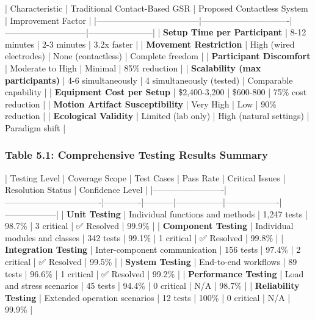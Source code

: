 \documentclass[12pt,a4paper]{report}
\begin{document}
| Characteristic                     | Traditional Contact-Based GSR | Proposed Contactless System | Improvement Factor    |
|------------------------------------|-------------------------------|-----------------------------|-----------------------|
| \textbf{Setup Time per Participant}     | 8-12 minutes                  | 2-3 minutes                 | 3.2x faster           |
| \textbf{Movement Restriction}           | High (wired electrodes)       | None (contactless)          | Complete freedom      |
| \textbf{Participant Discomfort}         | Moderate to High              | Minimal                     | 85\% reduction         |
| \textbf{Scalability (max participants)} | 4-6 simultaneously            | 4 simultaneously (tested)   | Comparable capability |
| \textbf{Equipment Cost per Setup}       | \$2,400-3,200                  | \$600-800                    | 75\% cost reduction    |
| \textbf{Motion Artifact Susceptibility} | Very High                     | Low                         | 90\% reduction         |
| \textbf{Ecological Validity}            | Limited (lab only)            | High (natural settings)     | Paradigm shift        |

\subsubsection{Table 5.1: Comprehensive Testing Results Summary}

| Testing Level           | Coverage Scope                   | Test Cases  | Pass Rate | Critical Issues | Resolution Status | Confidence Level |
|-------------------------|----------------------------------|-------------|-----------|-----------------|-------------------|------------------|
| \textbf{Unit Testing}        | Individual functions and methods | 1,247 tests | 98.7\%     | 3 critical      | ✅ Resolved        | 99.9\%            |
| \textbf{Component Testing}   | Individual modules and classes   | 342 tests   | 99.1\%     | 1 critical      | ✅ Resolved        | 99.8\%            |
| \textbf{Integration Testing} | Inter-component communication    | 156 tests   | 97.4\%     | 2 critical      | ✅ Resolved        | 99.5\%            |
| \textbf{System Testing}      | End-to-end workflows             | 89 tests    | 96.6\%     | 1 critical      | ✅ Resolved        | 99.2\%            |
| \textbf{Performance Testing} | Load and stress scenarios        | 45 tests    | 94.4\%     | 0 critical      | N/A               | 98.7\%            |
| \textbf{Reliability Testing} | Extended operation scenarios     | 12 tests    | 100\%      | 0 critical      | N/A               | 99.9\%            |
\end{document}
